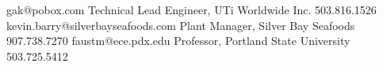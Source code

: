 {gak@pobox.com}
{Technical Lead Engineer, UTi Worldwide Inc.}
{503.816.1526}
{kevin.barry@silverbayseafoods.com}
{Plant Manager, Silver Bay Seafoods}
{907.738.7270}
{faustm@ece.pdx.edu}
{Professor, Portland State University}
{503.725.5412}
